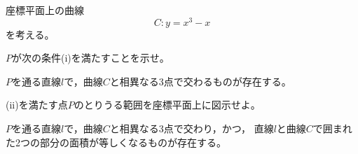 \documentclass[../../main.tex]{subfiles}
\begin{document}
座標平面上の曲線
\[ C:y=x^3-x \]
を考える。
\begin{enumerate}
  $P$が次の条件(i)を満たすことを示せ。
    \begin{enumerate}
      $P$を通る直線$l$で，曲線$C$と相異なる3点で交わるものが存在する。
    \end{enumerate}
  (ii)を満たす点$P$のとりうる範囲を座標平面上に図示せよ。
    \begin{enumerate}
      $P$を通る直線$l$で，曲線$C$と相異なる3点で交わり，かつ，
        直線$l$と曲線$C$で囲まれた2つの部分の面積が等しくなるものが存在する。
    \end{enumerate}
\end{enumerate}
\end{document}
